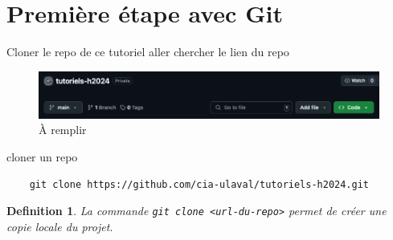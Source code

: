 \documentclass{book}
\newtheorem{definition}{Definition}
\begin{document}
\section{Première étape avec Git}

Cloner le repo de ce tutoriel
aller chercher le lien du repo

\begin{figure}[!h]
    \includegraphics[width=\textwidth]{images/clone_button_github.png}
    \caption{À remplir} \label{fig:clone_button}
\end{figure}

cloner un repo
\begin{lstlisting}
    git clone https://github.com/cia-ulaval/tutoriels-h2024.git
\end{lstlisting}


\begin{definition}
    La commande \texttt{\emph{git clone <url-du-repo>}} permet de créer une copie locale du projet. 
\end{definition}
\end{document}
